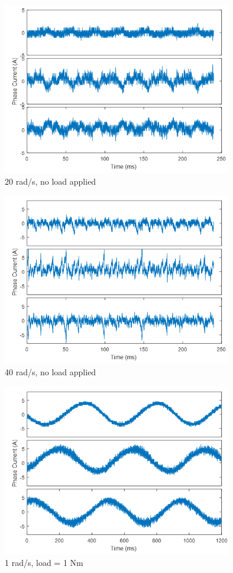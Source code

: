 \begin{figure}[h!p]
\centering
\includegraphics[width=10cm]{Images/waveforms/sin8.png} 
\caption[sin8]{20 rad/s, no load applied}
\label{fig:sin8}
\end{figure}

\begin{figure}[h!p]
\centering
\includegraphics[width=10cm]{Images/waveforms/sin9.png} 
\caption[sin9]{40 rad/s, no load applied}
\label{fig:sin9}
\end{figure}

\begin{figure}[h!p]
\centering
\includegraphics[width=10cm]{Images/waveforms/sin10.png} 
\caption[sin10]{1 rad/s, load = 1 Nm}
\label{fig:sin10}
\end{figure}

